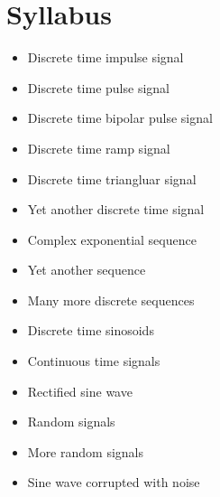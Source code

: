 \documentclass[../course]{subfiles}
\begin{document}
\section{Syllabus}

\begin{itemize}
    \item Discrete time impulse signal
    \item Discrete time pulse signal
    \item Discrete time bipolar pulse signal
    \item Discrete time ramp signal
    \item Discrete time triangluar signal
    \item Yet another discrete time signal
    \item Complex exponential sequence
    \item Yet another sequence
    \item Many more discrete sequences
    \item Discrete time sinosoids
    \item Continuous time signals
    \item Rectified sine wave
    \item Random signals
    \item More random signals
    \item Sine wave corrupted with noise
\end{itemize}
\end{document}
